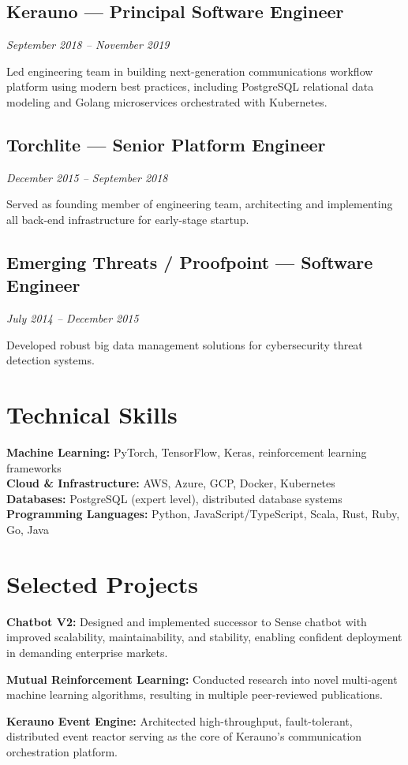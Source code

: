 \documentclass[11pt,letterpaper]{article}
\newcommand{\job}[4]{%
	\subsection{#1 --- #2}
	\textit{#3}

	#4

	\vspace{0.1in}
}
\begin{document}
\job{Kerauno}{Principal Software Engineer}{September 2018 -- November 2019}{Led engineering team in building next-generation communications workflow platform using modern best practices, including PostgreSQL relational data modeling and Golang microservices orchestrated with Kubernetes.}

\job{Torchlite}{Senior Platform Engineer}{December 2015 -- September 2018}{Served as founding member of engineering team, architecting and implementing all back-end infrastructure for early-stage startup.}

\job{Emerging Threats / Proofpoint}{Software Engineer}{July 2014 -- December 2015}{Developed robust big data management solutions for cybersecurity threat detection systems.}

\section{Technical Skills}

\textbf{Machine Learning:} PyTorch, TensorFlow, Keras, reinforcement learning frameworks \\[0.05in]
\textbf{Cloud \& Infrastructure:} AWS, Azure, GCP, Docker, Kubernetes \\[0.05in]
\textbf{Databases:} PostgreSQL (expert level), distributed database systems \\[0.05in]
\textbf{Programming Languages:} Python, JavaScript/TypeScript, Scala, Rust, Ruby, Go, Java

\section{Selected Projects}

\textbf{Chatbot V2:} Designed and implemented successor to Sense chatbot with improved scalability, maintainability, and stability, enabling confident deployment in demanding enterprise markets.

\vspace{0.1in}

\textbf{Mutual Reinforcement Learning:} Conducted research into novel multi-agent machine learning algorithms, resulting in multiple peer-reviewed publications.

\vspace{0.1in}

\textbf{Kerauno Event Engine:} Architected high-throughput, fault-tolerant, distributed event reactor serving as the core of Kerauno's communication orchestration platform.
\end{document}
